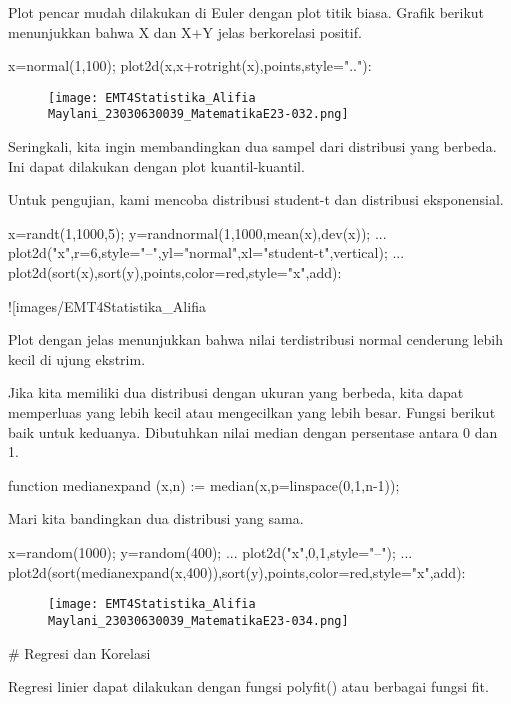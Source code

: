\documentclass{article}
\begin{document}
Plot pencar mudah dilakukan di Euler dengan plot titik biasa. Grafik
berikut menunjukkan bahwa X dan X+Y jelas berkorelasi positif.


\>x=normal(1,100); plot2d(x,x+rotright(x),\>points,style=".."):


\begin{figure}
    \centering
    \texttt{[image: EMT4Statistika\_Alifia Maylani\_23030630039\_MatematikaE23-032.png]}
    \caption{}
    \label{fig:enter-label}
\end{figure}

Seringkali, kita ingin membandingkan dua sampel dari distribusi yang
berbeda. Ini dapat dilakukan dengan plot kuantil-kuantil.


Untuk pengujian, kami mencoba distribusi student-t dan distribusi
eksponensial. 


\>x=randt(1,1000,5); y=randnormal(1,1000,mean(x),dev(x)); ...  
\>   plot2d("x",r=6,style="--",yl="normal",xl="student-t",\>vertical); ...  
\>   plot2d(sort(x),sort(y),\>points,color=red,style="x",\>add):


![images/EMT4Statistika_Alifia%

Plot dengan jelas menunjukkan bahwa nilai terdistribusi normal
cenderung lebih kecil di ujung ekstrim.


Jika kita memiliki dua distribusi dengan ukuran yang berbeda, kita
dapat memperluas yang lebih kecil atau mengecilkan yang lebih besar.
Fungsi berikut baik untuk keduanya. Dibutuhkan nilai median dengan
persentase antara 0 dan 1.


\>function medianexpand (x,n) := median(x,p=linspace(0,1,n-1));


Mari kita bandingkan dua distribusi yang sama.


\>x=random(1000); y=random(400); ...  
\>   plot2d("x",0,1,style="--"); ...  
\>   plot2d(sort(medianexpand(x,400)),sort(y),\>points,color=red,style="x",\>add):


\begin{figure}
    \centering
    \texttt{[image: EMT4Statistika\_Alifia Maylani\_23030630039\_MatematikaE23-034.png]}
    \caption{}
    \label{fig:enter-label}
\end{figure}

# Regresi dan Korelasi

Regresi linier dapat dilakukan dengan fungsi polyfit() atau berbagai
fungsi fit.
\end{document}
